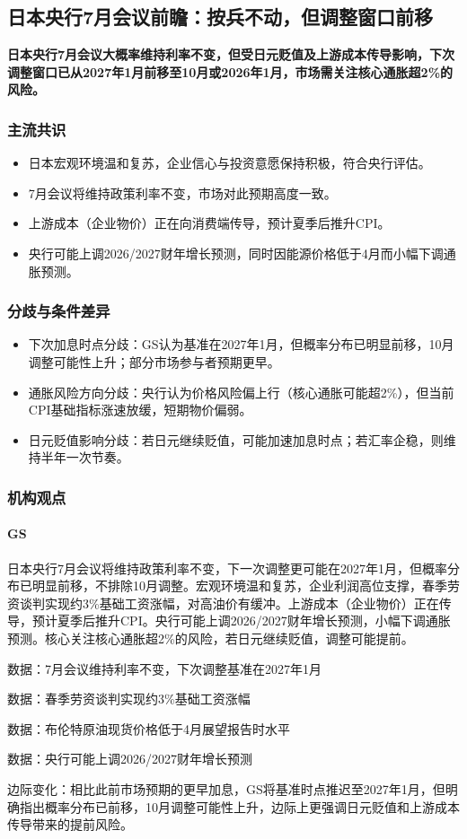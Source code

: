 \documentclass[11pt]{ctexart}
\begin{document}
\subsection{日本央行7月会议前瞻：按兵不动，但调整窗口前移}
\textbf{日本央行7月会议大概率维持利率不变，但受日元贬值及上游成本传导影响，下次调整窗口已从2027年1月前移至10月或2026年1月，市场需关注核心通胀超2\%的风险。}
\subsubsection*{主流共识}
\begin{itemize}
  \item 日本宏观环境温和复苏，企业信心与投资意愿保持积极，符合央行评估。
  \item 7月会议将维持政策利率不变，市场对此预期高度一致。
  \item 上游成本（企业物价）正在向消费端传导，预计夏季后推升CPI。
  \item 央行可能上调2026/2027财年增长预测，同时因能源价格低于4月而小幅下调通胀预测。
\end{itemize}
\subsubsection*{分歧与条件差异}
\begin{itemize}
  \item 下次加息时点分歧：GS认为基准在2027年1月，但概率分布已明显前移，10月调整可能性上升；部分市场参与者预期更早。
  \item 通胀风险方向分歧：央行认为价格风险偏上行（核心通胀可能超2\%），但当前CPI基础指标涨速放缓，短期物价偏弱。
  \item 日元贬值影响分歧：若日元继续贬值，可能加速加息时点；若汇率企稳，则维持半年一次节奏。
\end{itemize}
\subsubsection*{机构观点}
\paragraph{GS} 日本央行7月会议将维持政策利率不变，下一次调整更可能在2027年1月，但概率分布已明显前移，不排除10月调整。宏观环境温和复苏，企业利润高位支撑，春季劳资谈判实现约3\%基础工资涨幅，对高油价有缓冲。上游成本（企业物价）正在传导，预计夏季后推升CPI。央行可能上调2026/2027财年增长预测，小幅下调通胀预测。核心关注核心通胀超2\%的风险，若日元继续贬值，调整可能提前。
{\small\color{refgray}数据：7月会议维持利率不变，下次调整基准在2027年1月\par}
{\small\color{refgray}数据：春季劳资谈判实现约3\%基础工资涨幅\par}
{\small\color{refgray}数据：布伦特原油现货价格低于4月展望报告时水平\par}
{\small\color{refgray}数据：央行可能上调2026/2027财年增长预测\par}
{\small\color{refgray}边际变化：相比此前市场预期的更早加息，GS将基准时点推迟至2027年1月，但明确指出概率分布已前移，10月调整可能性上升，边际上更强调日元贬值和上游成本传导带来的提前风险。\par}
\end{document}
